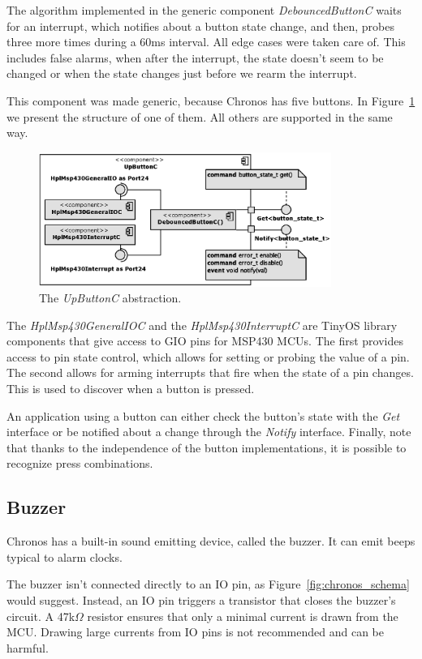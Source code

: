 The algorithm implemented in the generic component \emph{DebouncedButtonC} waits for an interrupt, which notifies about a button state change, and then, probes three more times during a 60ms interval. All edge cases were taken care of. This includes false alarms, when after the interrupt, the state doesn't seem to be changed or when the state changes just before we rearm the interrupt.

This component was made generic, because Chronos has five buttons. In Figure~\ref{fig:UpButtonC} we present the structure of one of them. All others are supported in the same way.

\begin{figure}[h]
  \centering
  \includegraphics[width=0.85\textwidth]{diagrams/UpButtonC.eps}
  \caption{The \emph{UpButtonC} abstraction.}
  \label{fig:UpButtonC}
\end{figure}
The \emph{HplMsp430GeneralIOC} and the \emph{HplMsp430InterruptC} are TinyOS library components that give access to GIO pins for MSP430 MCUs. The first provides access to pin state control, which allows for setting or probing the value of a pin. The second allows for arming interrupts that fire when the state of a pin changes. This is used to discover when a button is pressed.

An application using a button can either check the button's state with the \emph{Get} interface or be notified about a change through the \emph{Notify} interface. Finally, note that thanks to the independence of the button implementations, it is possible to recognize press combinations.

\subsection{Buzzer}

Chronos has a built-in sound emitting device, called the buzzer. It can emit beeps typical to alarm clocks.

The buzzer isn't connected directly to an IO pin, as Figure~\ref{fig:chronos_schema} would suggest. Instead, an IO pin triggers a transistor that closes the buzzer's circuit. A 47k$\Omega$ resistor ensures that only a minimal current is drawn from the MCU. Drawing large currents from IO pins is not recommended and can be harmful.

